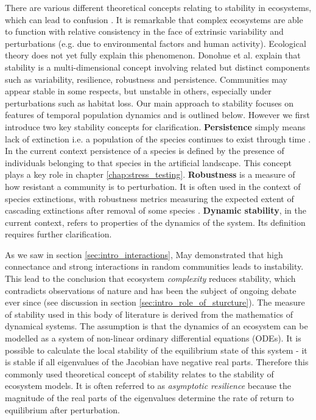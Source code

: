 There are various different theoretical concepts relating to stability in ecosystems, which can lead to confusion \cite{arnoldi2015,mumby2014ecological}. It is remarkable that complex ecosystems are able to function with relative consistency in the face of extrinsic variability and perturbations (e.g. due to environmental factors and human activity). Ecological theory does not yet fully explain this phenomenon. Donohue et al. \cite{donohue2013dimensionality} explain that stability is a multi-dimensional concept involving related but distinct components such as variability, resilience, robustness and persistence. Communities may appear stable in some respects, but unstable in others, especially under perturbations such as habitat loss. Our main approach to stability focuses on features of temporal population dynamics and is outlined below. However we first introduce two key stability concepts for clarification. \textbf{Persistence} simply means lack of extinction i.e. a population of the species continues to exist through time \cite{dytham1995effect}. In the current context persistence of a species is defined by the presence of individuals belonging to that species in the artificial landscape. This concept plays a key role in chapter \ref{chap:stress_testing}. \textbf{Robustness} is a measure of how resistant a community is to perturbation. It is often used in the context of species extinctions, with robustness metrics measuring the expected extent of cascading extinctions after removal of some species \cite{evans2013robustness}. \textbf{Dynamic stability}, in the current context, refers to properties of the dynamics of the system. Its definition requires further clarification.    

As we saw in section \ref{sec:intro_interactions}, May demonstrated \cite{may1972will} that high connectance and strong interactions in random communities leads to instability. This lead to the conclusion that ecosystem \emph{complexity} reduces stability, which contradicts observations of nature and has been the subject of ongoing debate ever since (see discussion in section \ref{sec:intro_role_of_sturcture}). The measure of stability used in this body of literature is derived from the mathematics of dynamical systems. The assumption is that the dynamics of an ecosystem can be modelled as a system of non-linear ordinary differential equations (ODEs). It is possible to calculate the local stability of the equilibrium state of this system - it is stable if all eigenvalues of the Jacobian have negative real parts. Therefore this commonly used theoretical concept of stability relates to the stability of ecosystem models. It is often referred to as \emph{asymptotic resilience} \cite{arnoldi2015} because the magnitude of the real parts of the eigenvalues determine the rate of return to equilibrium after perturbation. 

